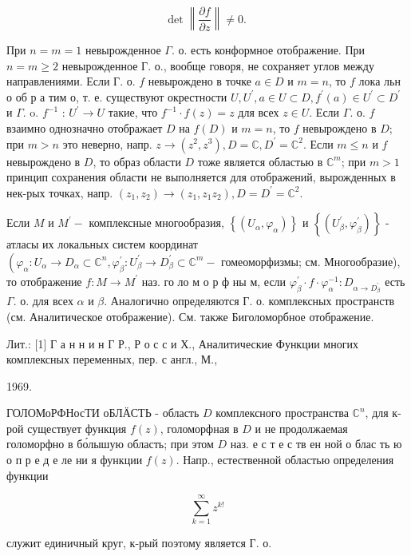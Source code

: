 \documentclass[10pt]{article}
\begin{document}
\[

\operatorname{det}\left\|\frac{\partial f}{\partial z}\right\| \neq 0 \text {. }

\]



При $n=m=1$ невырожденное $\Gamma$. о. есть конформное отображение. При $n=m \geqslant 2$ невырожденное Г. о., вообще говоря, не сохраняет углов между направлениями. Если Г. о. $f$ невырождено в точке $a \in D$ и $m=n$, то $f$ лока льн о об р а тим о, т. е. существуют окрестности $U, U^{\prime}, a \in U \subset D, f^{\prime}(a) \in U^{\prime} \subset D^{\prime}$ и $\Gamma$. o. $f^{-1}$ : $U^{\prime} \rightarrow U$ такие, что $f^{-1} \cdot f(z)=z$ для всех $z \in U$. Если $\Gamma$. $о$. $f$ взаимно однозначно отображает $D$ на $f(D)$ и $m=n$, то $f$ невырождено в $D$; при $m>n$ это неверно, напр. $z \rightarrow\left(z^{2}, z^{3}\right), D=\mathbb{C}, D^{\prime}=\mathbb{C}^{2}$. Если $m \leqslant n$ и $f$ невырождено в $D$, то образ области $D$ тоже является областью в $\mathbb{C}^{m}$; при $m>1$ принцип сохранения области не выполняется для отображений, вырожденных в нек-рых точках, напр. $\left(z_{1}, z_{2}\right) \rightarrow\left(z_{1}, z_{1} z_{2}\right), D=D^{\prime}=\mathbb{C}^{2}$.



Если $M$ и $M^{\prime}-$ комплексные многообразия, $\left\{\left(U_{\alpha}, \varphi_{\alpha}\right)\right\}$ и $\left\{\left(U_{\beta}^{\prime}, \varphi_{\beta}^{\prime}\right)\right\}$ - атласы их локальных систем координат $\left(\varphi_{\alpha}: U_{\alpha} \rightarrow D_{\alpha} \subset \mathbb{C}^{n}, \varphi_{\beta}^{\prime}: U_{\beta}^{\prime} \rightarrow D_{\beta}^{\prime} \subset \mathbb{C}^{m}-\right.$ гомеоморфизмы; см. Многообразие), то отображение $f: M \rightarrow M^{\prime}$ наз. го ло м о р ф ны м, если $\varphi_{\beta}^{\prime} \cdot f \cdot \varphi_{\alpha}^{-1}: D_{\alpha \rightarrow D_{\beta}^{\prime}}$ есть $\Gamma$. о. для всех $\alpha$ и $\beta$. Аналогично определяются Г. о. комплексных пространств (см. Аналитическое отображение). См. также Биголоморбное отображение.



Лит.: [1] Г а н н и н Г Р., Р о с с и Х., Аналитические Функции многих комплексных переменных, пер. с англ., М.,

1969.



ГОЛОМоРФНосТИ оБЛӒСТЬ - область $D$ комплексного пространства $\mathbb{C}^{n}$, для к-рой существует функция $f(z)$, голоморфная в $D$ и не продолжаемая голоморфно в бо́лышую область; при этом $D$ наз. е с т е с тв ен ной о блас ть ю о п р е д е ле ни я функции $f(z)$. Напр., естественной областью определения функции



\[

\sum_{k=1}^{\infty} z^{k !}

\]



служит единичный круг, к-рый поэтому является Г. о.
\end{document}
